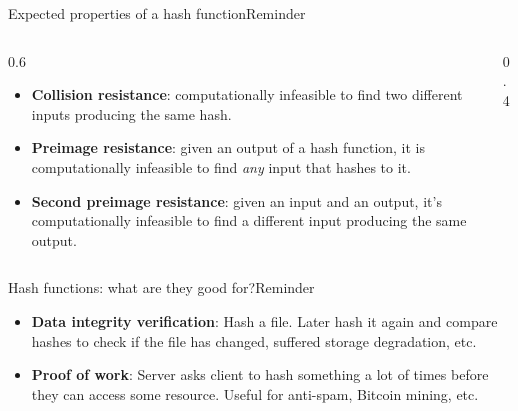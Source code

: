 \ifdefined\PRESENTATION\else\PassOptionsToClass{handout}{beamer}\fi\documentclass[aspectratio=169, lualatex]{beamer}
\begin{document}
\begin{frame}{Expected properties of a hash function}{Reminder}
	\begin{columns}[c]
		\begin{column}{0.6\textwidth}
			\begin{itemize}
				\item \textbf{Collision resistance}: computationally infeasible to find
				      two different inputs producing the same hash.
				\item \textbf{Preimage resistance}: given an output of a hash function,
				      it is computationally infeasible to find \emph{any} input that hashes to it.
				\item \textbf{Second preimage resistance}: given an input and an output,
				      it's computationally infeasible to find a different input
				      producing the same output.
			\end{itemize}
		\end{column}
		\begin{column}{0.4\textwidth}
		\end{column}
	\end{columns}
\end{frame}

\begin{frame}{Hash functions: what are they good for?}{Reminder}
	\begin{itemize}
		\item \textbf{Data integrity verification}: Hash a file. Later hash it
		      again and compare hashes to check if the file has changed, suffered storage
		      degradation, etc.
		\item \textbf{Proof of work}: Server asks client to hash something a lot of
		      times before they can access some resource. Useful for anti-spam, Bitcoin
		      mining, etc.
	\end{itemize}
\end{frame}
\end{document}
